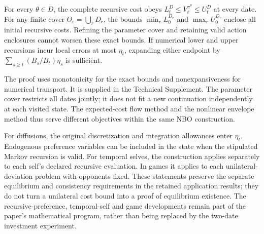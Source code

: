 \begin{proposition}\label{prop:nonlinear86}
For every $\theta\in D$, the complete recursive cost obeys
$L_t^D\le V_t^{\pi^\theta}\le U_t^D$ at every date. For any finite cover $\Theta_\epsilon=\bigcup_rD_r$, the bounds $\min_rL_0^{D_r}$ and $\max_rU_0^{D_r}$ enclose all initial recursive costs. Refining the parameter cover and retaining valid action enclosures cannot worsen these exact bounds. If numerical lower and upper recursions incur local errors at most $\eta_t$, expanding either endpoint by $\sum_{s\ge t}(B_s/B_t)\eta_s$ is sufficient.
\end{proposition}

The proof uses monotonicity for the exact bounds and nonexpansiveness for numerical transport. It is supplied in the Technical Supplement. The parameter cover restricts all dates jointly; it does not fit a new continuation independently at each visited state. The expected-cost flow method and the nonlinear envelope method thus serve different objectives within the same NBO construction.

For diffusions, the original discretization and integration allowances enter $\eta_t$. Endogenous preference variables can be included in the state when the stipulated Markov recursion is valid. For temporal selves, the construction applies separately to each self's declared recursive evaluation. In games it applies to each unilateral-deviation problem with opponents fixed. These statements preserve the separate equilibrium and consistency requirements in the retained application results; they do not turn a unilateral cost bound into a proof of equilibrium existence. The recursive-preference, temporal-self and game developments remain part of the paper's mathematical program, rather than being replaced by the two-date investment experiment.
